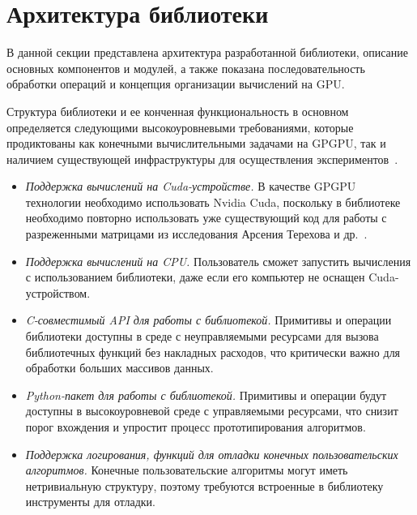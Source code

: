 \section{Архитектура библиотеки}

В данной секции представлена архитектура разработанной библиотеки, описание основных компонентов и модулей, а также показана последовательность обработки операций и концепция организации вычислений на GPU.

Структура библиотеки и ее конченная функциональность в основном определяется следующими высокоуровневыми требованиями, которые продиктованы как конечными вычислительными задачами на GPGPU, так и наличием существующей инфраструктуры для осуществления экспериментов~\cite{net:cfpq_py_algo}.

\begin{itemize}[noitemsep,topsep=0pt,parsep=0pt,partopsep=0pt]
    \item \textit{Поддержка вычислений на Cuda-устройстве.} В качестве GPGPU технологии необходимо использовать Nvidia Cuda, поскольку в библиотеке необходимо повторно использовать уже существующий код для работы с разреженными матрицами из исследования Арсения Терехова и др.~\cite{inproceedings:cfqp_matrix_with_single_source}.
    \item \textit{Поддержка вычислений на CPU.} Пользователь сможет запустить вычисления с использованием библиотеки, даже если его компьютер не оснащен Cuda-устройством.
    \item \textit{C-совместимый API для работы с библиотекой.} Примитивы и операции библиотеки доступны в среде с неуправляемыми ресурсами для вызова библиотечных функций без накладных расходов, что критически важно для обработки больших массивов данных.
    \item \textit{Python-пакет для работы с библиотекой.} Примитивы и операции будут доступны в высокоуровневой среде с управляемыми ресурсами, что снизит порог вхождения и упростит процесс прототипирования алгоритмов.
    \item \textit{Поддержка логирования, функций для отладки конечных пользовательских алгоритмов.} Конечные пользовательские алгоритмы могут иметь нетривиальную структуру, поэтому требуются встроенные в библиотеку инструменты для отладки.
\end{itemize}

